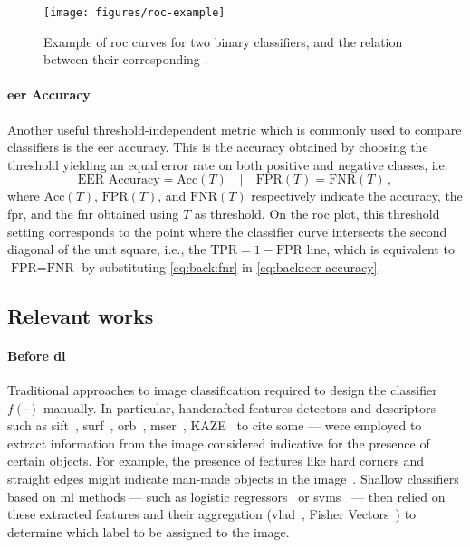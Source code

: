 \begin{figure}
    \centering
    \texttt{[image: figures/roc-example]}
    \caption{Example of \acrfull{roc} curves for two binary classifiers, and the relation between their corresponding .}
    \label{fig:back:roc}
\end{figure}

\paragraph{\acrshort{eer} Accuracy}
Another useful threshold-independent metric which is commonly used to compare classifiers is the \gls{eer} accuracy.
This is the accuracy obtained by choosing the threshold yielding an equal error rate on both positive and negative classes, i.e.
\begin{equation} \label{eq:back:eer-accuracy}
    \text{EER\ Accuracy} = \text{Acc}(T) \quad | \quad \text{FPR}(T) = \text{FNR}(T) \,,
\end{equation}
where $\text{Acc}(T)$, $\text{FPR}(T)$, and $\text{FNR}(T)$ respectively indicate the accuracy, the \gls{fpr}, and the \gls{fnr} obtained using $T$ as threshold.
On the \gls{roc} plot, this threshold setting corresponds to the point where the classifier curve intersects the second diagonal of the unit square, i.e., the $\text{TPR} = 1 - \text{FPR}$ line, which is equivalent to $\text{FPR} = \text{FNR}$ by substituting \ref{eq:back:fnr} in \ref{eq:back:eer-accuracy}.

\subsection{Relevant works}
\label{subsec:back:classif-relwork}

\paragraph{Before \acrlong{dl}}
Traditional approaches to image classification required to design the classifier $f(\cdot)$ manually.
In particular, handcrafted features detectors and descriptors --- such as \acrshort{sift}~\cite{lowe2004distinctive}, \acrshort{surf}~\cite{bay2006surf}, \acrshort{orb}~\cite{rublee2011orb}, \acrshort{mser}~\cite{matas2004robust}, KAZE~\cite{alcantarilla2012kaze} to cite some --- were employed to extract information from the image considered indicative for the presence of certain objects.
For example, the presence of features like hard corners and straight edges might indicate man-made objects in the image~\cite{piccinini2012real}.
Shallow classifiers based on \gls{ml} methods --- such as logistic regressors~\cite{mensink2012metric} or \glspl{svm}~\cite{arandjelovic2012three} --- then relied on these extracted features and their aggregation (\gls{vlad}~\cite{jegou2010aggregating}, Fisher Vectors~\cite{perronnin2010improving}) to determine which label to be assigned to the image.

